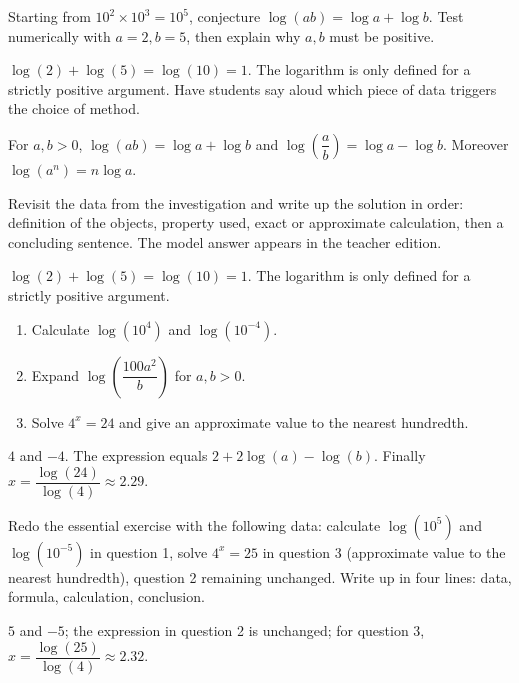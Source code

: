 \begin{activity}
Starting from $10^2\times10^3=10^5$, conjecture $\log(ab)=\log a+\log b$. Test numerically with $a=2,b=5$, then explain why $a,b$ must be positive.

\end{activity}
\begin{solution}$\log(2)+\log(5)=\log(10)=1$. The logarithm is only defined for a strictly positive argument. Have students say aloud which piece of data triggers the choice of method.\end{solution}

\begin{summary}For $a,b>0$, $\log(ab)=\log a+\log b$ and $\log\!\left(\dfrac ab\right)=\log a-\log b$. Moreover $\log(a^n)=n\log a$.\end{summary}

\begin{example}
Revisit the data from the investigation and write up the solution in order: definition of the objects, property used, exact or approximate calculation, then a concluding sentence. The model answer appears in the teacher edition.
\end{example}
\begin{solution}$\log(2)+\log(5)=\log(10)=1$. The logarithm is only defined for a strictly positive argument.\end{solution}

\begin{exercise}[essential]
\begin{enumerate}\item Calculate $\log(10^4)$ and $\log(10^{-4})$.\item Expand $\log\!\left(\dfrac{100a^2}{b}\right)$ for $a,b>0$.\item Solve $4^x=24$ and give an approximate value to the nearest hundredth.\end{enumerate}
\end{exercise}
\begin{solution}$4$ and $-4$. The expression equals $2+2\log(a)-\log(b)$. Finally $x=\dfrac{\log(24)}{\log(4)}\approx\num{2,29}$.\end{solution}


\begin{homework}Redo the essential exercise with the following data: calculate $\log(10^{5})$ and $\log(10^{-5})$ in question 1, solve $4^x=25$ in question 3 (approximate value to the nearest hundredth), question 2 remaining unchanged. Write up in four lines: data, formula, calculation, conclusion.\end{homework}
\begin{solution}$5$ and $-5$; the expression in question 2 is unchanged; for question 3, $x=\dfrac{\log(25)}{\log(4)}\approx\num{2,32}$.\end{solution}

